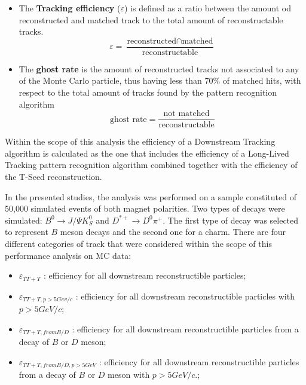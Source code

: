 \begin{itemize}
    \item The \textbf{Tracking efficiency} ($\varepsilon$) is defined as a ratio between the amount od reconstructed and matched track to the total amount of reconstructable tracks. 
    \begin{equation}
        \varepsilon  = \frac{\textrm{reconstructed} \cap  \textrm{matched}}{\textrm{reconstructable}}
    \end{equation}
    \item The \textbf{ghost rate} is the amount of reconstructed tracks not associated to any of the Monte Carlo particle, thus having less than 70\% of matched hits, with respect to the total amount of tracks found by the pattern recognition algorithm
    \begin{equation}
       \textrm{ghost rate} =  \frac{\textrm{not matched}}{\textrm{reconstructable}}
    \end{equation}
\end{itemize}

 Within the scope of this analysis the efficiency of a Downstream Tracking algorithm is calculated as the one that includes the efficiency of a Long-Lived Tracking pattern recognition algorithm combined together with the efficiency of the T-Seed reconstruction.

In the presented studies, the analysis was performed on a sample constituted of 50,000 simulated events of both magnet polarities. Two types of decays were simulated: $B^{0} \rightarrow J/\Psi K^{0}_{S}$ and $D^{*+} \rightarrow D^{0}\pi^+$. The first type of decay was selected to represent $B$ meson decays and the second one for a charm. 
There are four different categories of track that were considered within the scope of this performance analysis on MC data:

\begin{itemize}
    \item $\varepsilon_{TT+T}$ : efficiency for all downstream reconstructible particles;
    \item $\varepsilon_{TT+T, p>5Gev/c}$ : efficiency for all downstream reconstructible particles with $p> 5 GeV/c$;
    \item $\varepsilon_{TT+T, from B/D}$ : efficiency for all downstream reconstructible particles from a decay of $B$ or $D$ meson;
    \item $\varepsilon_{TT+T, from B/D, p>5 GeV }$ : efficiency for all downstream reconstructible particles from a decay of $B$ or $D$ meson with  $p> 5 GeV/c$.;
\end{itemize}

